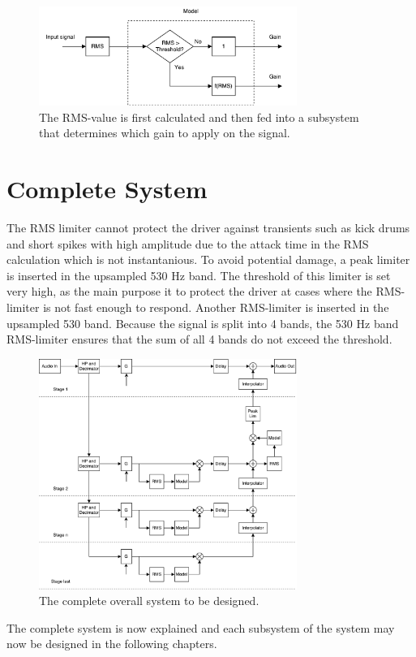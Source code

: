 \begin{figure}[H]
\centering
\includegraphics[width=0.75\textwidth]{figures/designRealRMS.pdf}
\caption{The RMS-value is first calculated and then fed into a subsystem that determines which gain to apply on the signal.}
\label{fig:designRealRMS}
\end{figure}




\section{Complete System} \label{sec:CompleteSystem}

The RMS limiter cannot protect the driver against transients such as kick drums and short spikes with high amplitude due to the attack time in the RMS calculation which is not instantanious. To avoid potential damage, a peak limiter is inserted in the upsampled 530 Hz band. The threshold of this limiter is set very high, as the main purpose it to protect the driver at cases where the RMS-limiter is not fast enough to respond. Another RMS-limiter is inserted in the upsampled 530 band. Because the signal is split into 4 bands, the 530 Hz band RMS-limiter ensures that the sum of all 4 bands do not exceed the threshold.

\begin{figure}[H]
\centering
\includegraphics[width=0.75\textwidth]{figures/designRealFull.pdf}
\caption{The complete overall system to be designed.}
\label{fig:designRealBlockFull}
\end{figure}


The complete system is now explained and each subsystem of the system may now be designed in the following chapters.
